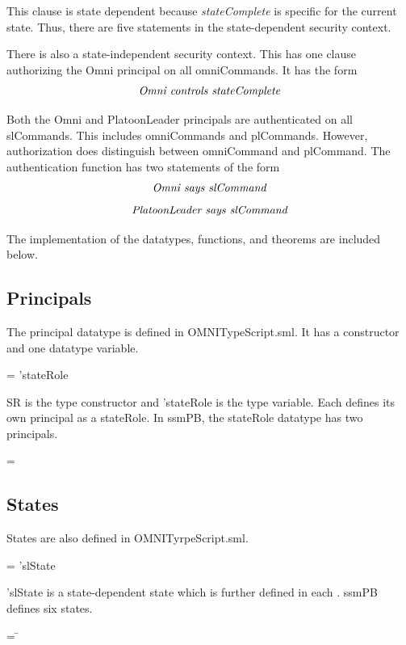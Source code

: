 \documentclass[../../main/main.tex]{subfiles}
\begin{document}
This clause is state dependent because \textit{stateComplete} is specific for the current state.  Thus, there are five statements in the state-dependent security context.

There is also a state-independent security context.  This has one clause authorizing the Omni principal on all omniCommands.   It has the form
\[\text{\textit{Omni controls stateComplete}}\]

Both the Omni and PlatoonLeader principals are authenticated on all slCommands.  This includes omniCommands and plCommands.  However, authorization does distinguish between omniCommand and plCommand.  The authentication function has two statements of the form
\[\text{\textit{Omni says slCommand}}\]
\[\text{\textit{PlatoonLeader says slCommand}}\]  

The  implementation of the datatypes, functions, and theorems are included below.


\subsection{Principals}
The principal datatype is defined in OMNITypeScript.sml.  It has a constructor and one datatype variable.

 =  'stateRole

SR is the type constructor and 'stateRole is the type variable.  Each  defines its own principal as a stateRole. In ssmPB, the stateRole datatype has two principals.

 =  \HOLTokenBar{} 

\subsection{States}
States are also defined in OMNITyrpeScript.sml.

 =   \HOLTokenBar{}  'slState

'slState is a state-dependent state which is further defined in each .  ssmPB defines six states.

\begin{tabbing}
 = \= \\
					\>\HOLTokenBar{}  \\
					\>\HOLTokenBar{}  \\
					\>\HOLTokenBar{} \\
        					\>\HOLTokenBar{}  \\
					\>\HOLTokenBar{} 
\end{tabbing}
\end{document}
